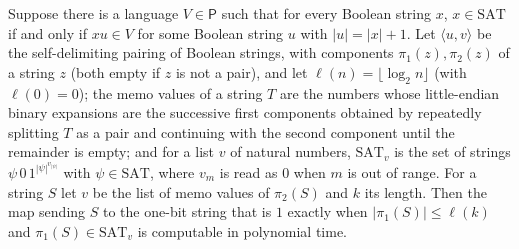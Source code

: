 \begin{theorem}
\label{Complexity.ladner_short_pad_FP}
\leanok
{}
Suppose there is a language $V\in\mathsf P$ such that for every Boolean string $x$, $x\in\mathrm{SAT}$ if and only if $xu\in V$ for some Boolean string $u$ with $|u|=|x|+1$. Let $\langle u,v\rangle$ be the self-delimiting pairing of Boolean strings, with components $\pi_1(z),\pi_2(z)$ of a string $z$ (both empty if $z$ is not a pair), and let $\ell(n)=\lfloor\log_2 n\rfloor$ (with $\ell(0)=0$); the memo values of a string $T$ are the numbers whose little-endian binary expansions are the successive first components obtained by repeatedly splitting $T$ as a pair and continuing with the second component until the remainder is empty; and for a list $v$ of natural numbers, $\mathrm{SAT}_v$ is the set of strings $\psi\,0\,1^{|\psi|^{v_{|\psi|}}}$ with $\psi\in\mathrm{SAT}$, where $v_m$ is read as $0$ when $m$ is out of range. For a string $S$ let $v$ be the list of memo
values of $\pi_2(S)$ and $k$ its length. Then the map sending $S$ to the one-bit string that is
$1$ exactly when $|\pi_1(S)|\le\ell(k)$ and $\pi_1(S)\in\mathrm{SAT}_v$ is computable in
polynomial time.
\end{theorem}

